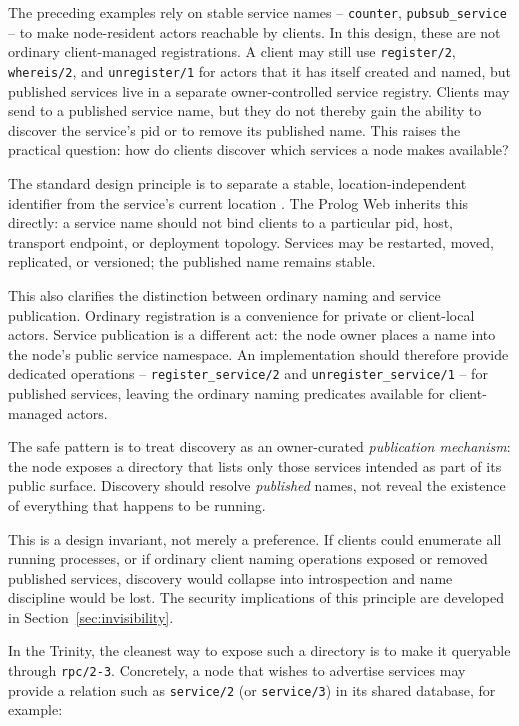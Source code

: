 The preceding examples rely on stable service names -- \texttt{counter},
\texttt{pubsub\_service} -- to make node-resident actors reachable by
clients. In this design, these are not ordinary client-managed
registrations. A client may still use \texttt{register/2},
\texttt{whereis/2}, and \texttt{unregister/1} for actors that it has
itself created and named, but published services live in a separate
owner-controlled service registry. Clients may send to a published
service name, but they do not thereby gain the ability to discover the
service's pid or to remove its published name. This raises the practical
question: how do clients discover which services a node makes available?

The standard design principle is to separate a stable,
location-independent identifier from the service's current location
\cite{vanSteenTanenbaum2023DistributedSystems}. The Prolog Web inherits
this directly: a service name should not bind clients to a particular
pid, host, transport endpoint, or deployment topology. Services may be
restarted, moved, replicated, or versioned; the published name remains
stable.

This also clarifies the distinction between ordinary naming and service
publication. Ordinary registration is a convenience for private or
client-local actors. Service publication is a different act: the node
owner places a name into the node's public service namespace. An
implementation should therefore provide dedicated operations --
\texttt{register\_service/2} and \texttt{unregister\_service/1} -- for
published services, leaving the ordinary naming predicates available for
client-managed actors.

The safe pattern is to treat discovery as an owner-curated
\emph{publication mechanism}: the node exposes a directory that lists
only those services intended as part of its public surface. Discovery
should resolve \emph{published} names, not reveal the existence of
everything that happens to be running.

This is a design invariant, not merely a preference. If clients could
enumerate all running processes, or if ordinary client naming operations
exposed or removed published services, discovery would collapse into
introspection and name discipline would be lost. The security
implications of this principle are developed in
Section~\ref{sec:invisibility}.

In the Trinity, the cleanest way to expose such a directory is to make it
queryable through \texttt{rpc/2-3}. Concretely, a node that wishes to
advertise services may provide a relation such as \texttt{service/2} (or
\texttt{service/3}) in its shared database, for example:


